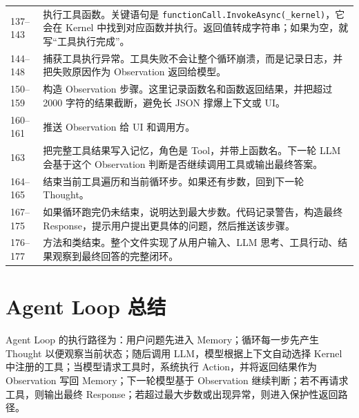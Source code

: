 \documentclass[UTF8,a4paper,11pt]{ctexart}
\begin{document}
\begin{longtable}{p{2.4cm}p{12.6cm}}
137--143 & 执行工具函数。关键语句是 \texttt{functionCall.InvokeAsync(\_kernel)}，它会在 Kernel 中找到对应函数并执行。返回值转成字符串；如果为空，就写“工具执行完成”。\\
144--148 & 捕获工具执行异常。工具失败不会让整个循环崩溃，而是记录日志，并把失败原因作为 Observation 返回给模型。\\
150--159 & 构造 Observation 步骤。这里记录函数名和函数返回结果，并把超过 2000 字符的结果截断，避免长 JSON 撑爆上下文或 UI。\\
160--161 & 推送 Observation 给 UI 和调用方。\\
163 & 把完整工具结果写入记忆，角色是 Tool，并带上函数名。下一轮 LLM 会基于这个 Observation 判断是否继续调用工具或输出最终答案。\\
164--165 & 结束当前工具遍历和当前循环步。如果还有步数，回到下一轮 Thought。\\
167--175 & 如果循环跑完仍未结束，说明达到最大步数。代码记录警告，构造最终 Response，提示用户提出更具体的问题，然后推送该步骤。\\
176--177 & 方法和类结束。整个文件实现了从用户输入、LLM 思考、工具行动、结果观察到最终回答的完整闭环。\\
\bottomrule
\end{longtable}

\section{Agent Loop 总结}
Agent Loop 的执行路径为：用户问题先进入 Memory；循环每一步先产生 Thought 以便观察当前状态；随后调用 LLM，模型根据上下文自动选择 Kernel 中注册的工具；当模型请求工具时，系统执行 Action，并将返回结果作为 Observation 写回 Memory；下一轮模型基于 Observation 继续判断；若不再请求工具，则输出最终 Response；若超过最大步数或出现异常，则进入保护性返回路径。
\end{document}
